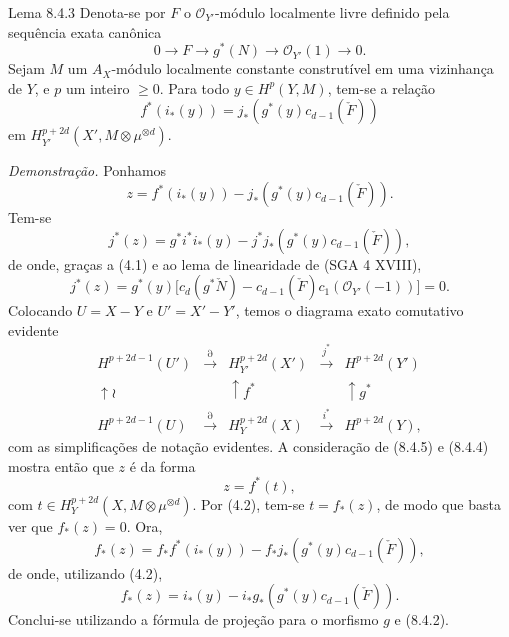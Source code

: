 \begin{statement}{Lema 8.4.3}
Denota-se por $F$ o $\mathcal O_{Y'}$-módulo localmente livre definido pela sequência exata canônica
\[
0\to F\to g^*(N)\to\mathcal O_{Y'}(1)\to0.
\]
Sejam $M$ um $A_X$-módulo localmente constante construtível em uma vizinhança de $Y$, e $p$ um inteiro $\ge0$. Para todo $y\in H^p(Y,M)$, tem-se a relação
\[
f^*(i_*(y))=j_*(g^*(y)c_{d-1}(\check F))
\]
em $H_{Y'}^{p+2d}(X',M\otimes\mu^{\otimes d})$.
\end{statement}

\emph{Demonstração.} Ponhamos
\[
z=f^*(i_*(y))-j_*(g^*(y)c_{d-1}(\check F)).
\]
Tem-se
\[
j^*(z)=g^*i^*i_*(y)-j^*j_*(g^*(y)c_{d-1}(\check F)),
\]
de onde, graças a (4.1) e ao lema de linearidade de (SGA 4 XVIII),
\[
j^*(z)=g^*(y)\bigl[c_d(g^*\check N)-c_{d-1}(\check F)c_1(\mathcal O_{Y'}(-1))\bigr]=0.
\tag{8.4.4}
\]
Colocando $U=X-Y$ e $U'=X'-Y'$, temos o diagrama exato comutativo evidente
\[
\begin{array}{ccccc}
H^{p+2d-1}(U')&\xrightarrow{\partial}&H^{p+2d}_{Y'}(X')&\xrightarrow{j^*}&H^{p+2d}(Y')\\
\uparrow\wr&&\uparrow f^*&&\uparrow g^*\\
H^{p+2d-1}(U)&\xrightarrow{\partial}&H_Y^{p+2d}(X)&\xrightarrow{i^*}&H^{p+2d}(Y),
\end{array}
\tag{8.4.5}
\]
com as simplificações de notação evidentes. A consideração de (8.4.5) e (8.4.4) mostra então que $z$ é da forma
\[
z=f^*(t),
\]
com $t\in H_Y^{p+2d}(X,M\otimes\mu^{\otimes d})$. Por (4.2), tem-se $t=f_*(z)$, de modo que basta ver que $f_*(z)=0$. Ora,
\[
f_*(z)=f_*f^*(i_*(y))-f_*j_*(g^*(y)c_{d-1}(\check F)),
\]
de onde, utilizando (4.2),
\[
f_*(z)=i_*(y)-i_*g_*(g^*(y)c_{d-1}(\check F)).
\]
Conclui-se utilizando a fórmula de projeção para o morfismo $g$ e (8.4.2).
